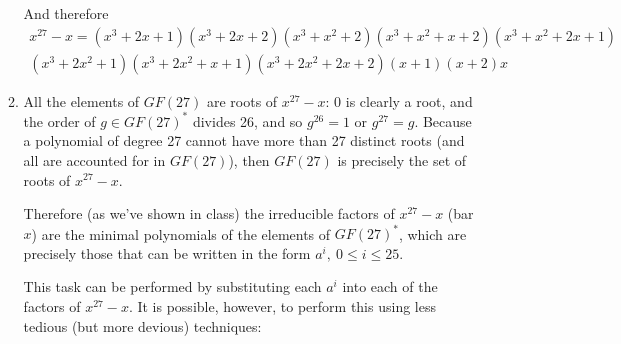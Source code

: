 \documentclass[11pt]{article} \usepackage{amssymb}
\begin{document}
\begin{enumerate}
\begin{enumerate}
    And therefore
    \begin{eqnarray*}
       x^{27} - x = (x^3 + 2x + 1)(x^3 + 2x + 2)(x^3 + x^2 + 2)(x^3 + x^2 + x + 2)(x^3 + x^2 + 2x + 1)&\\
    (x^3 + 2x^2 + 1)(x^3 + 2x^2 + x + 1)(x^3 + 2x^2 + 2x + 2)(x + 1)(x + 2)x&
    \end{eqnarray*}


  \item
    All the elements of $GF(27)$ are roots of $x^{27}-x$: 0 is clearly a root,
    and the order of $g \in GF(27)^*$ divides 26, and so $g^{26}=1$ or
    $g^{27}=g$. 
    Because a polynomial of degree 27 cannot have more than 27 distinct
    roots (and all are accounted for in $GF(27)$), then $GF(27)$ is precisely
    the set of roots of $x^{27}-x$.

    Therefore (as we've shown in class) the irreducible factors of $x^{27}-x$
    (bar $x$) are the minimal polynomials of the elements of $GF(27)^*$, which are 
    precisely those that can be written in the form $a^i,\:0 \leq i \leq 25$.

    This task can be performed by substituting each $a^i$ into each of the 
    factors of $x^{27}-x$. It is possible, however, to perform this using
    less tedious (but more devious) techniques:


\end{enumerate}
\end{enumerate}
\end{document}
